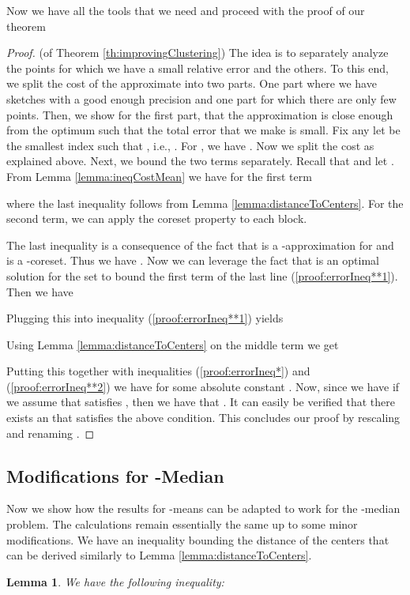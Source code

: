 \documentclass[a4paper,11pt,oneside,english,onecolumn]{article}
\newtheorem{lemma}[theorem]{Lemma}
\theoremstyle{definition}
\begin{document}
Now we have all the tools that we need and proceed with the proof of our theorem
\begin{proof}(of Theorem \ref{th:improvingClustering})
The idea is to separately analyze the points for which we have a small relative error and the others. To this end, we split the cost of the approximate into two parts. One part where we have sketches with a good enough precision and one part for which there are only few points. Then, we show for the first part, that the approximation is close enough from the optimum such that the total error that we make is small. Fix any  let  be the smallest index such that , i.e., . For , we have . Now we split the cost as explained above. 
Next, we bound the two terms separately. Recall that  and let . From  Lemma \ref{lemma:ineqCostMean} we have for the first term

where the last inequality follows from Lemma \ref{lemma:distanceToCenters}. For the second term, we can apply the coreset property to each block.

The last inequality is a consequence of the fact that  is a -approximation for  and  is a -coreset. Thus we have . Now we can leverage the fact that  is an optimal solution for the set  to bound the first term of the last line (\ref{proof:errorIneq**1}). Then we have

Plugging this into inequality (\ref{proof:errorIneq**1}) yields

Using Lemma \ref{lemma:distanceToCenters} on the middle term we get

Putting this together with inequalities (\ref{proof:errorIneq*}) and (\ref{proof:errorIneq**2}) we have
 for some absolute constant .
Now, since we have  if we assume that  satisfies , then we have that . It can easily be verified that there exists an  that satisfies the above condition. This concludes our proof by rescaling and renaming .
\end{proof}

\subsection{Modifications for -Median}
Now we show how the results for -means can be adapted to work for the -median problem. The calculations remain essentially the same up to some minor modifications. We have an inequality bounding the distance of the centers that can be derived similarly to Lemma \ref{lemma:distanceToCenters}.
\begin{lemma}
We have the following inequality: 
\end{lemma}
\end{document}
